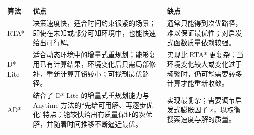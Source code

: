 \documentclass[../main.tex]{subfiles}
\begin{document}
\begin{center}
\renewcommand{\arraystretch}{1.25}
\begin{tabularx}{\textwidth}{>{\raggedright\arraybackslash}p{2.2cm}
>{\raggedright\arraybackslash}X
>{\raggedright\arraybackslash}X}
\toprule
算法 & 优点 & 缺点 \\
\midrule
RTA* 
& 决策速度快，适合时间约束很紧的场景；即使在未知或部分可知环境中，也能快速给出可行解。
& 通常只能得到次优路径，难以保证最优性；对启发式函数质量依赖较强。 \\

D* Lite
& 适合动态环境中的增量式重规划；能够复用已有计算结果，环境变化后只需局部修补，重新计算开销较小；可找到最优路径。
& 实现比 RTA* 更复杂；当环境变化较大或变化过于频繁时，仍可能需要较多计算才能重新收敛。 \\

AD*
& 结合了 D* Lite 的增量式重规划能力与 Anytime 方法的“先给可用解、再逐步优化”特点；能较快给出有质量保证的次优解，并随着时间推移不断逼近最优。
& 实现最复杂；需要调节启发式膨胀因子 $\varepsilon$，以权衡搜索速度与解的质量。 \\
\bottomrule
\end{tabularx}
\end{center}
\end{document}
